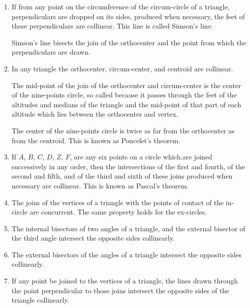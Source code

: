 \begin{enumerate}
\begin{enumerate}[(1)]
        \item If from any point on the circumference of the circum-circle of a
            triangle, perpendiculars are dropped on its sides, produced when
            necessary, the feet of these perpendiculars are collinear. This line
            is called Simson's line.

            Simson's line bisects the join of the orthocenter and the point from
            which the perpendiculars are drawn.

        \item In any triangle the orthocenter, circum-center, and centroid are
            collinear.

            The mid-point of the join of the orthocenter and circum-center is
            the center of the nine-points circle, so called because it passes
            through the feet of the altitudes and medians of the triangle and
            the mid-point of that part of each altitude which lies between the
            orthocenter and vertex.

            The center of the nine-points circle is twice as far from the
            orthocenter as from the centroid. This is known as Poncelet’s
            theorem.

        \item If $A$, $B$, $C$, $D$, $Z$, $F$, are any six points on a circle
            which.are joined successively in any order, then the intersections
            of the first and fourth, of the second and fifth, and of the third
            and sixth of these joins produced when necessary are collinear.  
            This is known as Pascal's theorem.

        \item The joins of the vertices of a triangle with the points of contact
            of the in-circle are concurrent. The same property holds for the
            ex-circles.

        \item The internal bisectors of two angles of a triangle, and the
            external bisector of the third angle intersect the opposite sides
            collinearly.

        \item The external bisectors of the angles of a triangle intersect the
            opposite sides collinearly.

        \item If any point be joined to the vertices of a triangle, the lines
            drawn through the point perpendicular to those joins intersect the
            opposite sides of the triangle collinearly.


\end{enumerate}
\end{enumerate}
